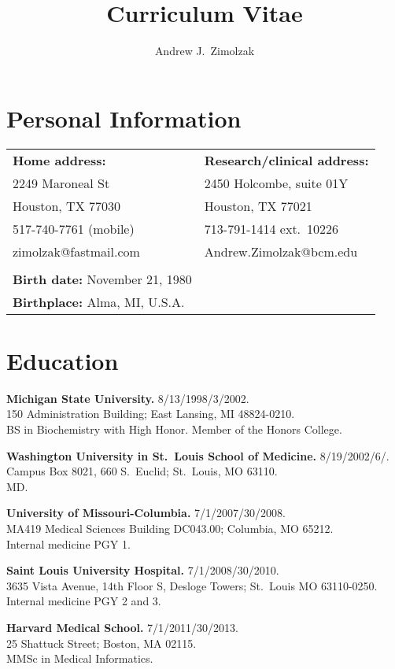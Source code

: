 \documentclass[10pt]{article}
\title{Curriculum Vitae}
\author{Andrew J.\ Zimolzak}
\begin{document}
\thispagestyle{fancy}

\section*{Personal Information}

\begin{tabular}{l l}
\textbf{Home address:}  & \textbf{Research/clinical address:}\\
2249 Maroneal St        & 2450 Holcombe, suite 01Y\\
Houston, TX 77030       & Houston, TX 77021\\
517-740-7761 (mobile)   & 713-791-1414 ext.\ 10226\\
zimolzak@fastmail.com   & Andrew.Zimolzak@bcm.edu\\
\\
\textbf{Birth date:} November 21, 1980\\
\textbf{Birthplace:} Alma, MI, U.S.A.
\end{tabular}


\section*{Education}

\textbf{Michigan State University.} 8/13/1998/3/2002.\\
150 Administration Building; East Lansing, MI 48824-0210.\\
BS in Biochemistry with High Honor. Member of the Honors College.

\textbf{Washington University in St.\ Louis School of Medicine.}
8/19/2002\ndash{}/6/.\\
Campus Box 8021, 660 S.\ Euclid; St.\ Louis, MO 63110.\\
MD.

\textbf{University of Missouri-Columbia.} 7/1/2007/30/2008.\\
MA419 Medical Sciences Building DC043.00; Columbia, MO 65212.\\
Internal medicine PGY 1.

\textbf{Saint Louis University Hospital.} 7/1/2008/30/2010.\\
3635 Vista Avenue, 14th Floor S, Desloge Towers; St.\ Louis MO
63110-0250.\\
Internal medicine PGY 2 and 3.

\textbf{Harvard Medical School.} 7/1/2011/30/2013.\\
25 Shattuck Street; Boston, MA 02115.\\
MMSc in Medical Informatics.
\end{document}
